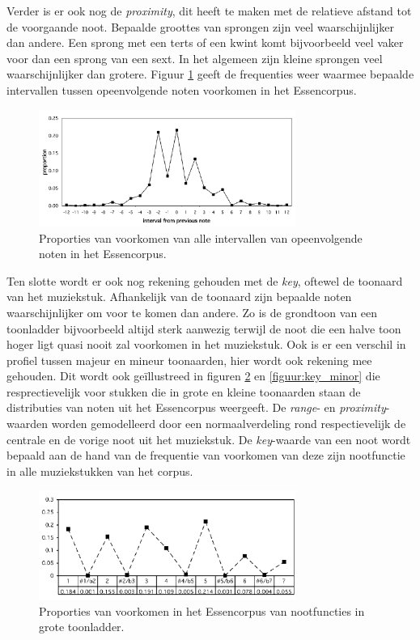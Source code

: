Verder is er ook nog de \textit{proximity}, dit heeft te maken met de relatieve afstand tot de voorgaande noot. Bepaalde groottes van sprongen zijn veel waarschijnlijker dan andere. Een sprong met een terts of een kwint komt bijvoorbeeld veel vaker voor dan een sprong van een sext. In het algemeen zijn kleine sprongen veel waarschijnlijker dan grotere. Figuur \ref{figuur:proximity} geeft de frequenties weer waarmee bepaalde intervallen tussen opeenvolgende noten voorkomen in het Essencorpus. \\

\begin{figure}[!ht]
  \centering
  \includegraphics[width=0.75\textwidth]{2_Objectieve_Beoordeling/proximity}
  \caption{Proporties van voorkomen van alle intervallen van opeenvolgende noten in het Essencorpus.}
  \label{figuur:proximity}
\end{figure}

Ten slotte wordt er ook nog rekening gehouden met de \textit{key}, oftewel de toonaard van het muziekstuk. Afhankelijk van de toonaard zijn bepaalde noten waarschijnlijker om voor te komen dan andere. Zo is de grondtoon van een toonladder bijvoorbeeld altijd sterk aanwezig terwijl de noot die een halve toon hoger ligt quasi nooit zal voorkomen in het muziekstuk. Ook is er een verschil in profiel tussen majeur en mineur toonaarden, hier wordt ook rekening mee gehouden. Dit wordt ook ge\"illustreed in figuren \ref{figuur:key_major} en \ref{figuur:key_minor} die resprectievelijk voor stukken die in grote en kleine toonaarden staan de distributies van noten uit het Essencorpus weergeeft. De \textit{range}- en \textit{proximity}-waarden worden gemodelleerd door een normaalverdeling rond respectievelijk de centrale en de vorige noot uit het muziekstuk. De \textit{key}-waarde van een noot wordt bepaald aan de hand van de frequentie van voorkomen van deze zijn nootfunctie in alle muziekstukken van het corpus.

\begin{figure}[!ht]
  \centering
  \includegraphics[width=0.75\textwidth]{2_Objectieve_Beoordeling/key_major}
  \caption{Proporties van voorkomen in het Essencorpus van nootfuncties in grote toonladder.}
  \label{figuur:key_major}
\end{figure}

